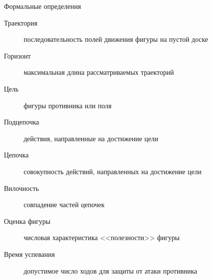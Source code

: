 \begin{frame}{Формальные определения}
\begin{description}
\item[Траектория] последовательность полей движения фигуры на пустой доске
\item[Горизонт] максимальная длина рассматриваемых траекторий
\item[Цель] фигуры противника или поля
\item[Подцепочка] действия, направленные на достижение цели
\item[Цепочка] совокупность действий, направленных на достижение цели
\item[Вилочность] совпадение частей цепочек
\item[Оценка фигуры] числовая характеристика <<полезности>> фигуры
\item[Время успевания] допустимое число ходов для защиты от атаки противника
\end{description}
\end{frame}
